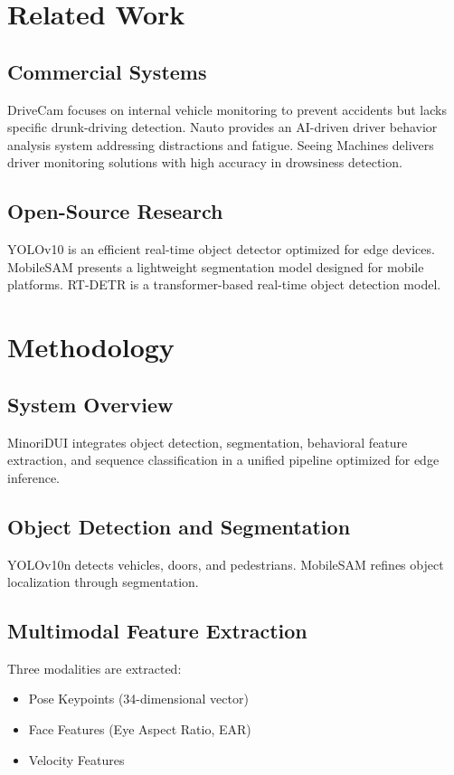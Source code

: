 \documentclass[conference]{IEEEtran}
\begin{document}
\section{Related Work}
\subsection{Commercial Systems}
DriveCam \cite{drivecam} focuses on internal vehicle monitoring to prevent accidents but lacks specific drunk-driving detection.  
Nauto \cite{nauto} provides an AI-driven driver behavior analysis system addressing distractions and fatigue.  
Seeing Machines \cite{seeingmachines} delivers driver monitoring solutions with high accuracy in drowsiness detection.

\subsection{Open-Source Research}
YOLOv10 \cite{yolov10} is an efficient real-time object detector optimized for edge devices.  
MobileSAM \cite{mobilesam} presents a lightweight segmentation model designed for mobile platforms.  
RT-DETR \cite{rtdetr} is a transformer-based real-time object detection model.

\section{Methodology}
\subsection{System Overview}
MinoriDUI integrates object detection, segmentation, behavioral feature extraction, and sequence classification in a unified pipeline optimized for edge inference.

\subsection{Object Detection and Segmentation}
YOLOv10n detects vehicles, doors, and pedestrians. MobileSAM refines object localization through segmentation.

\subsection{Multimodal Feature Extraction}
Three modalities are extracted:
\begin{itemize}
    \item Pose Keypoints (34-dimensional vector)
    \item Face Features (Eye Aspect Ratio, EAR)
    \item Velocity Features
\end{itemize}
\end{document}
